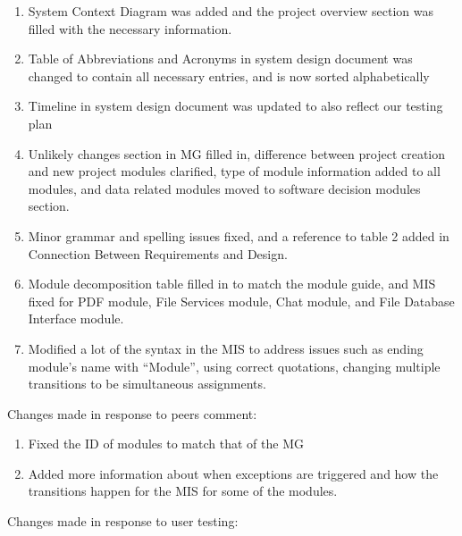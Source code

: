 \documentclass{article}
\begin{document}
	\begin{enumerate}
		\item System Context Diagram was added and the project overview section was filled with the necessary information.
		\item Table of Abbreviations and Acronyms in system design document was changed to contain all necessary entries, and is now sorted alphabetically
		\item Timeline in system design document was updated to also reflect our testing plan
		\item Unlikely changes section in MG filled in, difference between project creation and new project modules clarified, type of module information added to all modules, and data related modules moved to software decision modules section.
		\item Minor grammar and spelling issues fixed, and a reference to table 2 added in Connection Between Requirements and Design.
		\item Module decomposition table filled in to match the module guide, and MIS fixed for PDF module, File Services module, Chat module, and File Database Interface module.
		\item Modified a lot of the syntax in the MIS to address issues such as ending module's name with ``Module'', using correct quotations, changing multiple transitions to be simultaneous assignments.
	\end{enumerate}
	
	\noindent Changes made in response to peers comment:
	
	\begin{enumerate}
		\item Fixed the ID of modules to match that of the MG
		\item Added more information about when exceptions are triggered and how the transitions happen for the MIS for some of the modules.
	\end{enumerate}
	
	\noindent Changes made in response to user testing:
	
\end{document}
